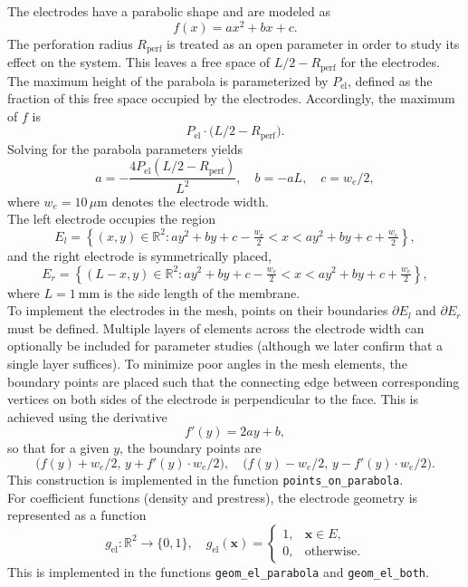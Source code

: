 The electrodes have a parabolic shape and are modeled as
\[
f(x) = a x^2 + b x + c.
\]
The perforation radius $R_\mathrm{perf}$ is treated as an open parameter in order to study its effect on the system. This leaves a free space of $L/2 - R_\mathrm{perf}$ for the electrodes. The maximum height of the parabola is parameterized by $P_\mathrm{el}$, defined as the fraction of this free space occupied by the electrodes. Accordingly, the maximum of $f$ is
\[
P_\mathrm{el} \cdot \bigl(L/2 - R_\mathrm{perf}\bigr).
\]
Solving for the parabola parameters yields
\[
a = -\frac{4 P_\mathrm{el} (L/2 - R_\mathrm{perf})}{L^2}, \quad 
b = -aL, \quad
c = w_e/2,
\]
where $w_e = 10\,\mu\mathrm{m}$ denotes the electrode width.\\

The left electrode occupies the region
\begin{equation}
    E_l = \left\{ (x,y) \in \mathbb{R}^2 : 
    a y^2 + b y + c - \tfrac{w_e}{2} < x < a y^2 + b y + c + \tfrac{w_e}{2} \right\},
    \label{eq:domain_left_electrode}
\end{equation}
and the right electrode is symmetrically placed,
\begin{equation}
    E_r = \left\{ (L-x,y) \in \mathbb{R}^2 : 
    a y^2 + b y + c - \tfrac{w_e}{2} < x < a y^2 + b y + c + \tfrac{w_e}{2} \right\},
    \label{eq:domain_right_electrode}
\end{equation}
where $L = \SI{1}{\milli\meter}$ is the side length of the membrane.\\

To implement the electrodes in the mesh, points on their boundaries $\partial E_l$ and $\partial E_r$ must be defined. Multiple layers of elements across the electrode width can optionally be included for parameter studies (although we later confirm that a single layer suffices). To minimize poor angles in the mesh elements, the boundary points are placed such that the connecting edge between corresponding vertices on both sides of the electrode is perpendicular to the face. This is achieved using the derivative
\[
f'(y) = 2 a y + b,
\]
so that for a given $y$, the boundary points are
\[
\bigl(f(y) + w_e/2,\, y + f'(y) \cdot w_e/2 \bigr), \quad
\bigl(f(y) - w_e/2,\, y - f'(y) \cdot w_e/2 \bigr).
\]
This construction is implemented in the function \texttt{points\_on\_parabola}.\\

For coefficient functions (density and prestress), the electrode geometry is represented as a function 
\[
g_\mathrm{el} : \mathbb{R}^2 \to \{0,1\}, \quad g_\mathrm{el}(\mathbf{x}) = 
\begin{cases}
1, & \mathbf{x} \in E,\\
0, & \text{otherwise}.
\end{cases}
\]
This is implemented in the functions \texttt{geom\_el\_parabola} and \texttt{geom\_el\_both}.\\

